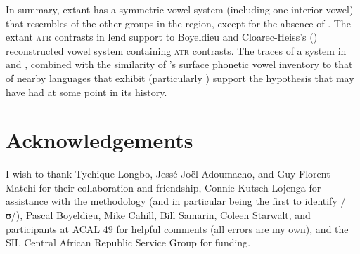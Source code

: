 \documentclass[output=paper,colorlinks,citecolor=brown]{langscibook}
\begin{document}
In summary, extant  has a symmetric  vowel system  (including one interior vowel) that resembles  of the other groups in the region, except for the absence of . The extant \textsc{atr} contrasts in  lend support to Boyeldieu and Cloarec-Heiss’s (\citeyear{BoyeldieuCloarec-Heiss2001}) reconstructed  vowel system  containing \textsc{atr} contrasts. The traces of a  system in  and , combined with the similarity of ’s surface phonetic vowel inventory to that of nearby languages that exhibit  (particularly ) support the hypothesis that  may have had  at some point in its history.

\section*{Acknowledgements}

I wish to thank Tychique Longbo, Jessé-Joël Adoumacho, and Guy-Florent Matchi for their collaboration and friendship, Connie Kutsch Lojenga for assistance with the methodology (and in particular being the first to identify /ʊ/), Pascal Boyeldieu, Mike Cahill, Bill Samarin, Coleen Starwalt, and participants at ACAL 49 for helpful comments (all errors are my own), and the SIL Central African Republic Service Group for funding.

{\sloppy\printbibliography[heading=subbibliography,notkeyword=this]}
\end{document}
